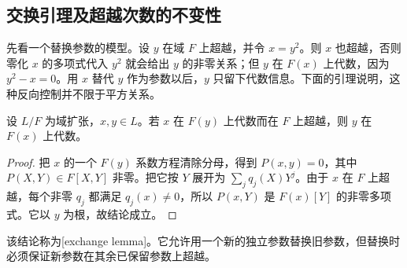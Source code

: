 \subsection{交换引理及超越次数的不变性}
\label{b1:subsec:1403:02}

先看一个替换参数的模型。设 \(y\) 在域 \(F\) 上超越，并令 \(x=y^2\)。则 \(x\) 也超越，否则零化 \(x\) 的多项式代入 \(y^2\) 就会给出 \(y\) 的非零关系；但 \(y\) 在 \(F(x)\) 上代数，因为 \(y^2-x=0\)。用 \(x\) 替代 \(y\) 作为参数以后，\(y\) 只留下代数信息。下面的引理说明，这种反向控制并不限于平方关系。

\begin{lemma}[交换引理]\label{b1:lem:transcendence-exchange}
	设 \(L/F\) 为域扩张，\(x,y\in L\)。若 \(x\) 在 \(F(y)\) 上代数而在 \(F\) 上超越，则 \(y\) 在 \(F(x)\) 上代数。
\end{lemma}
\begin{proof}
	把 \(x\) 的一个 \(F(y)\) 系数方程清除分母，得到 \(P(x,y)=0\)，其中 \(P(X,Y)\in F[X,Y]\) 非零。把它按 \(Y\) 展开为 \(\sum_j q_j(X)Y^j\)。由于 \(x\) 在 \(F\) 上超越，每个非零 \(q_j\) 都满足 \(q_j(x)\neq0\)，所以 \(P(x,Y)\) 是 \(F(x)[Y]\) 的非零多项式。它以 \(y\) 为根，故结论成立。
\end{proof}
该结论称为[exchange lemma]。它允许用一个新的独立参数替换旧参数，但替换时必须保证新参数在其余已保留参数上超越。

